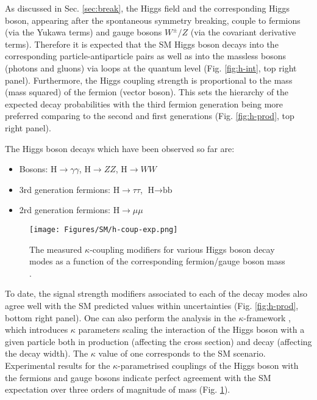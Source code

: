 As discussed in Sec. \ref{sec:break}, the Higgs field and the corresponding Higgs boson, appearing after the spontaneous symmetry breaking, couple to fermions (via the Yukawa terms) and gauge bosons $W^\pm/Z$ (via the covariant derivative terms). Therefore it is expected that the SM Higgs boson decays into the corresponding particle-antiparticle pairs as well as into the massless bosons (photons and gluons) via loops at the quantum level (Fig. \ref{fig:h-int}, top right panel). Furthermore, the Higgs coupling strength is proportional to the mass (mass squared) of the fermion (vector boson). This sets the hierarchy of the expected decay probabilities with the third fermion generation being more preferred comparing to the second and first generations (Fig. \ref{fig:h-prod}, top right panel). 

The Higgs boson decays which have been observed so far are:
\begin{itemize}
    \item Bosons: $\text{H} \to \gamma\gamma$, $\text{H} \to ZZ$, $\text{H} \to WW$
    \item 3rd generation fermions: $\text{H} \to \tau\tau$, $\text{H} \to \text{bb}$
    \item 2rd generation fermions: $\text{H} \to \mu\mu$
\end{itemize}

\begin{figure}[!ht]
    \centering
    \texttt{[image: Figures/SM/h-coup-exp.png]}
    \caption{The measured $\kappa$-coupling modifiers for various Higgs boson decay modes as a function of the corresponding fermion/gauge boson mass \cite{CMS:2022dwd}.}
    \label{fig:h-coup}
\end{figure}

To date, the signal strength modifiers associated to each of the decay modes also agree well with the SM predicted values within uncertainties (Fig. \ref{fig:h-prod}, bottom right panel). One can also perform the analysis in the $\kappa$-framework \cite{LHCHiggsCrossSectionWorkingGroup:2013rie}, which introduces $\kappa$ parameters scaling the interaction of the Higgs boson with a given particle both in production (affecting the cross section) and decay (affecting the decay width). The $\kappa$ value of one corresponds to the SM scenario. Experimental results for the $\kappa$-parametrised couplings of the Higgs boson with the fermions and gauge bosons indicate perfect agreement with the SM expectation over three orders of magnitude of mass (Fig. \ref{fig:h-coup}).  

